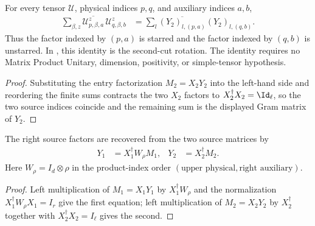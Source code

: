 \begin{lemma}
    \label{thm:mpu_source_y_two_rotated_gram}
    \leanok
    For every tensor $\mathcal U$, physical indices $p,q$, and auxiliary
    indices $a,b$,
    \begin{align}
        \sum_{\beta,z}
        \overline{\mathcal U^z_{p,\beta,a}}\,
        \mathcal U^z_{q,\beta,b}
         & =\sum_l \overline{(Y_2)_{l,(p,a)}}(Y_2)_{l,(q,b)}.
    \end{align}
    Thus the factor indexed by $(p,a)$ is starred and the factor indexed by
    $(q,b)$ is unstarred. In \cite[Theorem~III.8, Section~III.B, equations~(31)--(32)]{Cirac2017MPU}, this identity is the second-cut
    rotation.
    The identity requires no Matrix Product Unitary, dimension, positivity, or
    simple-tensor hypothesis.
\end{lemma}

\begin{proof}
    \leanok
    Substituting the entry factorization $M_2=X_2Y_2$ into the left-hand side
    and reordering the finite sums contracts the two $X_2$ factors to
    $X_2^\dagger X_2=\Id_\ell$, so the two source indices coincide and the
    remaining sum is the displayed Gram matrix of $Y_2$.
\end{proof}

\begin{lemma}
    \label{thm:mpu_source_factor_recovery}
    \leanok
    The right source factors are recovered from the two source matrices by
    \begin{align}
        Y_1 & =X_1^\dagger W_\rho M_1,
            & Y_2                      & =X_2^\dagger M_2.
    \end{align}
    Here $W_\rho=I_d\otimes\rho$ in the product-index order
    $(\text{upper physical},\text{right auxiliary})$.
\end{lemma}

\begin{proof}\leanok
    Left multiplication of $M_1=X_1Y_1$ by $X_1^\dagger W_\rho$ and the normalization
    $X_1^\dagger W_\rho X_1=I_r$ give the first equation; left multiplication of
    $M_2=X_2Y_2$ by $X_2^\dagger$ together with
    $X_2^\dagger X_2=I_\ell$ gives the second.
\end{proof}

